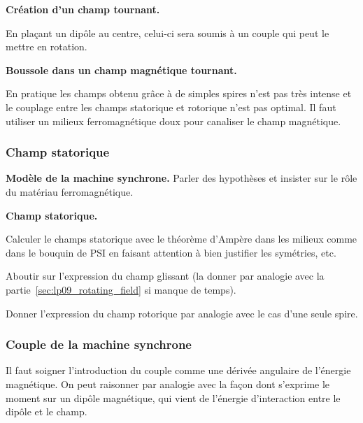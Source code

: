 \begin{slide}
\textbf{Création d'un champ tournant.}
\end{slide}

En plaçant un dipôle au centre, celui-ci sera soumis à un couple qui peut le mettre en rotation.

\begin{experience}
\textbf{Boussole dans un champ magnétique tournant.}
\end{experience}

\begin{transition}
En pratique les champs obtenu grâce à de simples spires n'est pas très intense et le couplage entre les champs statorique et rotorique n'est pas optimal.
Il faut utiliser un milieux ferromagnétique doux pour canaliser le champ magnétique.
\end{transition}

\subsubsection{Champ statorique}

\begin{slide}
\textbf{Modèle de la machine synchrone.}
Parler des hypothèses et insister sur le rôle du matériau ferromagnétique.
\end{slide}

\begin{slide}
\textbf{Champ statorique.}
\end{slide}

Calculer le champs statorique avec le théorème d'Ampère dans les milieux comme dans le bouquin de PSI en faisant attention à bien justifier les symétries, etc.

Aboutir sur l'expression du champ glissant (la donner par analogie avec la partie~\ref{sec:lp09_rotating_field} si manque de temps).

Donner l'expression du champ rotorique par analogie avec le cas d'une seule spire.

\subsubsection{Couple de la machine synchrone}

\begin{remarque}
Il faut soigner l'introduction du couple comme une dérivée angulaire de l'énergie magnétique.
On peut raisonner par analogie avec la façon dont s'exprime le moment sur un dipôle magnétique, qui vient de l'énergie d'interaction entre le dipôle et le champ. 
\end{remarque}

